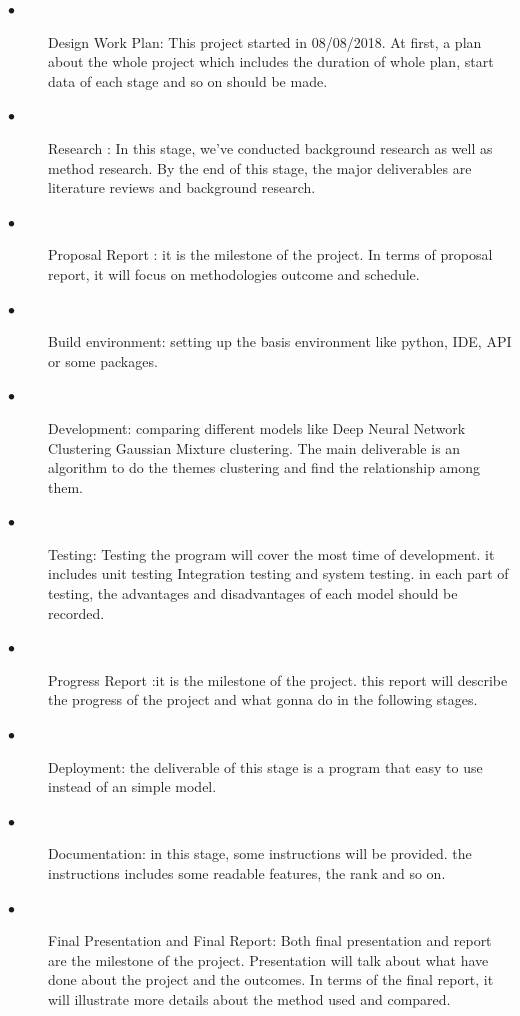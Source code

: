 \documentclass[12pt]{article}
\begin{document}
\begin{description}
\item[$\bullet$ ] Design Work Plan: This project started in 08/08/2018. At first, a plan  about the whole project  which includes the duration of whole plan, start data of each stage and so on should be made.
\item[$\bullet$ ] Research : In this stage, we’ve conducted background research as well as method research. By the end of this stage, the major deliverables are literature reviews and background research.
\item[$\bullet$ ] Proposal Report : it is the milestone of the project. In terms of proposal report, it will focus on methodologies outcome and schedule.
\item[$\bullet$ ] Build environment: setting up the basis environment like python, IDE, API or some packages.
\item[$\bullet$ ] Development: comparing different models like Deep Neural Network Clustering Gaussian Mixture clustering. The main deliverable is   an algorithm to do the themes clustering and find the relationship among them.
\item[$\bullet$ ] Testing: Testing the program will cover the most time of development. it includes unit testing Integration testing and system testing. in each part of testing, the advantages and disadvantages of each model should be recorded.
\item[$\bullet$ ] Progress Report :it is the milestone of the project. this report will describe the progress of the project and what gonna do in the following stages.
\item[$\bullet$ ] Deployment: the deliverable of this stage is a program that easy to use instead of an simple model.
\item[$\bullet$ ] Documentation: in this stage, some instructions will be provided. the instructions includes some readable features, the rank and so on.
 \item[$\bullet$ ] Final Presentation and Final Report: Both final presentation and report are the milestone of the project. Presentation will talk about what have done about the project and the outcomes.  In terms of the final report, it will illustrate more details about the method used and compared.
\end{description}


\cleardoublepage


\end{document}

